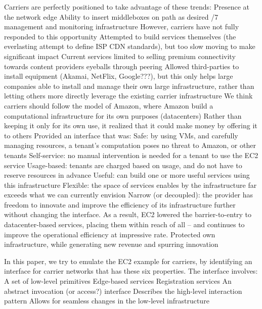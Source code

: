 \begin{outline}
{\1 Carriers are perfectly positioned to take advantage of these trends:
    \2 Presence at the network edge
    \2 Ability to insert middleboxes on path as desired
    /7 management and monitoring infrastructure
\1 However, carriers have not fully responded to this opportunity
    \2 Attempted to build services themselves (the everlasting attempt to define ISP CDN standards), but too slow moving to make significant impact
        \3 Current services limited to selling premium connectivity towards content providers eyeballs through peering
    \2 Allowed third-parties to install equipment (Akamai, NetFlix, Google???), but this only helps large companies able to install and manage their own large infrastructure, rather than letting others more directly leverage the existing carrier infrastructure 
\1 We think carriers should follow the model of Amazon, where
    \2 Amazon build a computational infrastructure for its own purposes (datacenters)
    \2 Rather than keeping it only for its own use, it realized that it could make money by offering it to others
    \2 Provided an interface that was:
        \3 Safe: by using VMs, and carefully managing resources, a tenant's computation poses no threat to Amazon, or other tenants
        \3 Self-service: no manual intervention is needed for a tenant to use the EC2 service
        \3 Usage-based: tenants are charged based on usage, and do not have to reserve resources in advance
        \3 Useful: can build one or more useful services using this infrastructure
        \3 Flexible: the space of services enables by the infrastructure far exceeds what we can currently envision
        \3 Narrow (or decoupled): the provider has freedom to innovate and improve the efficiency of its infrastructure further without changing the interface. 
    \2 As a result, EC2 lowered the barrier-to-entry to datacenter-based services, placing them within reach of all -- and continues to improve the operational efficiency at impressive rate.
        \3 Protected own infrastructure, while generating new revenue and spurring innovation

\1 In this paper, we try to emulate the EC2 example for carriers, by identifying an interface for carrier networks that has these six properties. The interface involves:
    \2 A set of low-level primitives
        \3 Edge-based services
        \3 Registration services
    \2 An abstract invocation (or access?) interface
        \3 Describes the high-level interaction pattern
        \3 Allows for seamless changes in the low-level infrastructure
        \3 
        

}
\end{outline}
